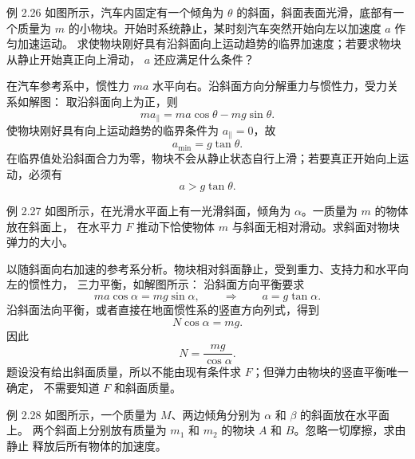 \begin{origexamplebox}{例 2.26}
如图所示，汽车内固定有一个倾角为 $\theta$ 的斜面，斜面表面光滑，底部有一个质量为
$m$ 的小物块。开始时系统静止，某时刻汽车突然开始向左以加速度 $a$ 作匀加速运动。
求使物块刚好具有沿斜面向上运动趋势的临界加速度；若要求物块从静止开始真正向上滑动，
$a$ 还应满足什么条件？
\probdiagTwoTwentySix
\end{origexamplebox}

\begin{xesolution}
在汽车参考系中，惯性力 $ma$ 水平向右。沿斜面方向分解重力与惯性力，受力关系如解图：
\soldiagTwoTwentySix
取沿斜面向上为正，则
\[
 ma_{\parallel}=ma\cos\theta-mg\sin\theta.
\]
使物块刚好具有向上运动趋势的临界条件为 $a_{\parallel}=0$，故
\[
 \boxed{a_{\min}=g\tan\theta}.
\]
在临界值处沿斜面合力为零，物块不会从静止状态自行上滑；若要真正开始向上运动，必须有
\[
 \boxed{a>g\tan\theta}.
\]
\end{xesolution}

\begin{origexamplebox}{例 2.27}
如图所示，在光滑水平面上有一光滑斜面，倾角为 $\alpha$。一质量为 $m$ 的物体放在斜面上，
在水平力 $F$ 推动下恰使物体 $m$ 与斜面无相对滑动。求斜面对物块弹力的大小。
\probdiagTwoTwentySeven
\end{origexamplebox}

\begin{xesolution}
以随斜面向右加速的参考系分析。物块相对斜面静止，受到重力、支持力和水平向左的惯性力，
三力平衡，如解图所示：
\soldiagTwoTwentySeven
沿斜面方向平衡要求
\[
 ma\cos\alpha=mg\sin\alpha,
 \qquad\Rightarrow\qquad a=g\tan\alpha.
\]
沿斜面法向平衡，或者直接在地面惯性系的竖直方向列式，得到
\[
 N\cos\alpha=mg.
\]
因此
\[
 \boxed{N=\frac{mg}{\cos\alpha}}.
\]
题设没有给出斜面质量，所以不能由现有条件求 $F$；但弹力由物块的竖直平衡唯一确定，
不需要知道 $F$ 和斜面质量。
\end{xesolution}

\begin{origexamplebox}{例 2.28}
如图所示，一个质量为 $M$、两边倾角分别为 $\alpha$ 和 $\beta$ 的斜面放在水平面上。
两个斜面上分别放有质量为 $m_1$ 和 $m_2$ 的物块 $A$ 和 $B$。忽略一切摩擦，求由静止
释放后所有物体的加速度。
\probdiagTwoTwentyEight
\end{origexamplebox}


